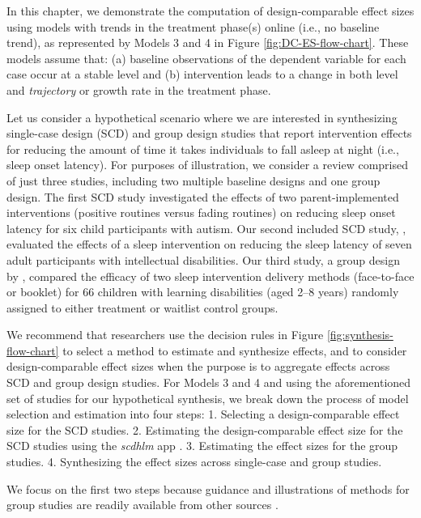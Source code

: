 \documentclass[
]{book}
\begin{document}
In this chapter, we demonstrate the computation of design-comparable effect sizes using models with trends in the treatment phase(s) online (i.e., no baseline trend), as represented by Models 3 and 4 in Figure \ref{fig:DC-ES-flow-chart}. These models assume that: (a) baseline observations of the dependent variable for each case occur at a stable level and (b) intervention leads to a change in both level and \emph{trajectory} or growth rate in the treatment phase.

Let us consider a hypothetical scenario where we are interested in synthesizing single-case design (SCD) and group design studies that report intervention effects for reducing the amount of time it takes individuals to fall asleep at night (i.e., sleep onset latency). For purposes of illustration, we consider a review comprised of just three studies, including two multiple baseline designs and one group design. The first SCD study \citep{delemere2018ParentImplemented} investigated the effects of two parent-implemented interventions (positive routines versus fading routines) on reducing sleep onset latency for six child participants with autism. Our second included SCD study, \citet{gunning2003Psychological}, evaluated the effects of a sleep intervention on reducing the sleep latency of seven adult participants with intellectual disabilities. Our third study, a group design by \citet{montgomery2004relative}, compared the efficacy of two sleep intervention delivery methods (face-to-face or booklet) for 66 children with learning disabilities (aged 2--8 years) randomly assigned to either treatment or waitlist control groups.

We recommend that researchers use the decision rules in Figure \ref{fig:synthesis-flow-chart} to select a method to estimate and synthesize effects, and to consider design-comparable effect sizes when the purpose is to aggregate effects across SCD and group design studies. For Models 3 and 4 and using the aforementioned set of studies for our hypothetical synthesis, we break down the process of model selection and estimation into four steps:
1. Selecting a design-comparable effect size for the SCD studies.
2. Estimating the design-comparable effect size for the SCD studies using the \emph{scdhlm} app \citep{pustejovsky2021scdhlm}.
3. Estimating the effect sizes for the group studies.
4. Synthesizing the effect sizes across single-case and group studies.

We focus on the first two steps because guidance and illustrations of methods for group studies are readily available from other sources \citep{borenstein2021introduction, cooper2019handbook}.
\end{document}
